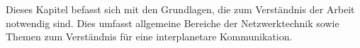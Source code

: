 \label{cap:grundlagen}
Dieses Kapitel befasst sich mit den Grundlagen, die zum Verst{\"a}ndnis der
Arbeit notwendig sind. Dies umfasst allgemeine Bereiche der
Netzwerktechnik sowie Themen zum Verständnis f{\"u}r eine interplanetare
Kommunikation.
